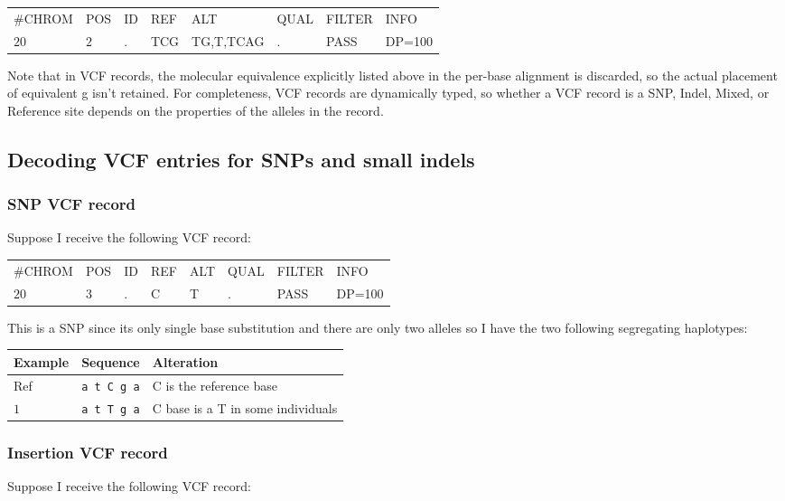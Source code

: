 \documentclass[8pt]{article}
\begin{document}
\vspace{0.3cm}
\begin{tabular}{ l l l l l l l l}
	\#CHROM & POS & ID & REF & ALT & QUAL & FILTER & INFO \\
	$20$ & $2$ & . & TCG & TG,T,TCAG & . & PASS & DP=100 \\
\end{tabular}
\vspace{0.3cm}

Note that in VCF records, the molecular equivalence explicitly listed above in the per-base alignment is discarded, so the actual placement of equivalent g isn't retained. For completeness, VCF records are dynamically typed, so whether a VCF record is a SNP, Indel, Mixed, or Reference site depends on the properties of the alleles in the record.

\subsection{Decoding VCF entries for SNPs and small indels}
\subsubsection{SNP VCF record}
Suppose I receive the following VCF record:

\vspace{0.3cm}
\begin{tabular}{ l l l l l l l l}
	\#CHROM & POS & ID & REF & ALT & QUAL & FILTER & INFO \\
	$20$ & $3$ & . & C & T & . & PASS & DP=100 \\
\end{tabular}
\vspace{0.3cm}

This is a SNP since its only single base substitution and there are only two alleles so I have the two following segregating haplotypes:

\vspace{0.3cm}
\begin{tabular}{ | l | l | l | }
\hline
Example & Sequence & Alteration \\ \hline
Ref & \verb|a t C g a| & C is the reference base \\ \hline
$1$ & \verb|a t T g a| & C base is a T in some individuals \\ \hline
\end{tabular}

\subsubsection{Insertion VCF record}
Suppose I receive the following VCF record:
\end{document}
